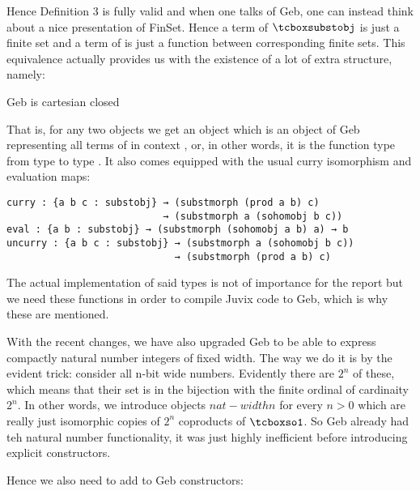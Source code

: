 Hence Definition 3 is fully valid and when one talks of Geb, one can instead think about a nice presentation of FinSet. Hence a term of $\gebobj$ is just a finite set and a term of  is just a function between corresponding finite sets. This equivalence actually provides us with the existence of a lot of extra structure, namely:

\begin{corollary}
Geb is cartesian closed
\end{corollary}

That is, for any two objects  we get an object  which is an object of Geb representing all terms of  in context , or, in other words, it is the function type from type  to type . It also comes equipped with the usual curry isomorphism and evaluation maps:

\begin{verbatim}
curry : {a b c : substobj} → (substmorph (prod a b) c) 
                           → (substmorph a (sohomobj b c))
eval : {a b : substobj} → (substmorph (sohomobj a b) a) → b
uncurry : {a b c : substobj} → (substmorph a (sohomobj b c)) 
                             → (substmorph (prod a b) c)
\end{verbatim}

The actual implementation of said types is not of importance for the report but we need these functions in order to compile Juvix code to Geb, which is why these are mentioned. 

With the recent changes, we have also upgraded Geb to be able to express compactly natural number integers of fixed width. The way we do it is by the evident trick: consider all n-bit wide numbers. Evidently there are $2^n$ of these, which means that their set is in the bijection with the finite ordinal of cardinaity $2^n$. In other words, we introduce objects $nat-width n$ for every $n > 0$ which are really just isomorphic copies of $2^n$ coproducts of $\gebterm$. So Geb already had teh natural number functionality, it was just highly inefficient before introducing explicit constructors.

Hence we also need to add to Geb constructors:

